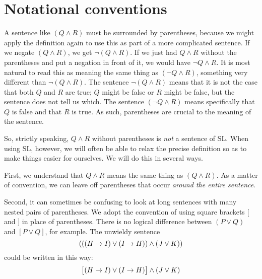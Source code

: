 {%

\section{Notational conventions}
\label{SLconventions}
A sentence like $(Q \land R)$ must be surrounded by parentheses, because we might apply the definition again to use this as part of a more complicated sentence. If we negate $(Q \land R)$, we get $\lnot(Q \land R)$. If we just had $Q \land R$ without the parentheses and put a negation in front of it, we would have $\lnot Q \land R$. It is most natural to read this as meaning the same thing as $(\lnot Q \land R)$, something very different than $\lnot(Q\land R)$. The sentence $\lnot(Q \land R)$ means that it is not the case that both $Q$ and $R$ are true; $Q$ might be false or $R$ might be false, but the sentence does not tell us which. The sentence $(\lnot Q \land R)$ means specifically that $Q$ is false and that $R$ is true. As such, parentheses are crucial to the meaning of the sentence.

So, strictly speaking, $Q \land R$ without parentheses is \emph{not} a sentence of SL. When using SL, however, we will often be able to relax the precise definition so as to make things easier for ourselves. We will do this in several ways.

First,  we understand that $Q \land R$ means the same thing as $(Q \land R)$. As a matter of convention, we can leave off parentheses that occur \emph{around the entire sentence}.

Second, it can sometimes be confusing to look at long sentences with many nested pairs of parentheses. We adopt the convention of using square brackets [ and ] in place of parentheses. There is no logical difference between $(P\lor Q)$ and $[P\lor Q]$, for example. The unwieldy sentence
$$(((H \mathrel{\rightarrow} I) \lor (I \mathrel{\rightarrow} H)) \land (J \lor K))$$
could be written in this way:
$$\bigl[(H \mathrel{\rightarrow} I) \lor (I \mathrel{\rightarrow} H)\bigr] \land (J \lor K)$$


}
